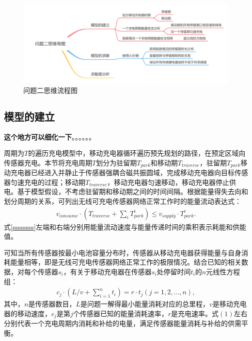 \documentclass{whutmod}
\begin{document}
			\begin{figure}[H]
				\centering
				\includegraphics[width=\textwidth]{figures/222222.png}
				\caption{问题二思维流程图}\label{ssssct}
			\end{figure}
		
		\subsection{模型的建立}
			\textbf{这个地方可以细化一下}。。。。。。
			
			周期为$T$的遍历充电模型中，移动充电器循环遍历预先规划的路径，在预定区域向传感器充电。本节将充电周期$T$划分为驻留期$T_{park}$和移动期$T_{traverse}$，驻留期$T_{park}$移动充电器已经进入并静止于传感器强耦合磁共振圆域，完成移动充电器向目标传感器匀速充电的过程；移动期$T_{traverse}$，移动充电器匀速移动，移动充电器停止供电。基于模型假设，不考虑驻留期和移动期之间的时间间隔。根据能量得失去向和划分周期的关系，可列出无线可充电传感器网络正常工作时的能量流动表达式：
			\begin{gather}\label{ssssssss}
			v_{consume}\cdot (T_{traverse}+\sum_{i} T_{park}^i)\leq v_{supply}\cdot T_{park}^i.
			\end{gather}
			式\ref{ssssssss}左端和右端分别用能量流动速度与能量传递时间的乘积表示耗能和供能值。
			
			可知当所有传感器按最小电池容量分布时，传感器从移动充电器获得能量与自身消耗能量相等，即是无线可充电传感器网络正常工作的极限情况。结合已知的相关数据，对每个传感器$s_i$，有关于移动充电器在传感器$s_i$处停留时间$t_i$的$n$元线性方程组：
			\begin{gather}
			c_{j} \cdot (L/v+\sum_{i=1}^{n}t_i)=r \cdot t_j (j=1,2,...,n),
			\end{gather}
			其中，$n$是传感器数目，$L$是问题一解得最小能量消耗对应的总里程，$v$是移动充电器的移动速度，$c_{j}$是第$j$个传感器已知的能量消耗速率，$r$是充电速率。式$(1)$左右分别代表一个充电周期内消耗和补给的电量，满足传感器能量消耗与补给的供需平衡。
			
\end{document}
